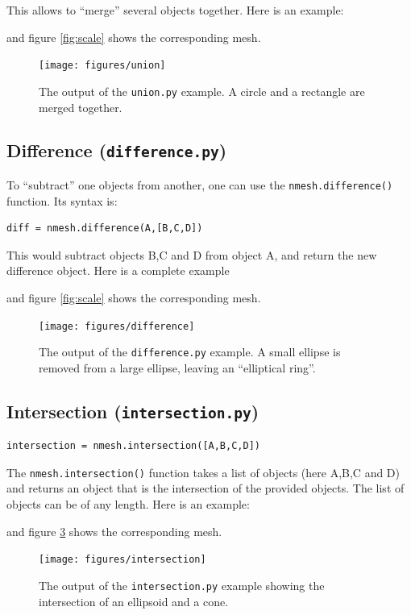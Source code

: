 \documentclass[10pt,a4paper]{book}
\newcommand{\py}[1]{\texttt{\color{blue}#1}}
\begin{document}
This allows to ``merge'' several objects together. Here is an example:

and figure \ref{fig:scale} shows the corresponding mesh.
\begin{figure}[tbhp]
\centerline{\texttt{[image: figures/union]}}
\caption{\label{fig:union} The output of the \py{union.py} example. A circle and a rectangle are merged together.}
\end{figure}


\subsection{Difference (\texttt{difference.py})}
To ``subtract'' one objects from another, one can use the \py{nmesh.difference()} function. Its syntax is:
\begin{lstlisting}
diff = nmesh.difference(A,[B,C,D])
\end{lstlisting}
This would subtract objects B,C and D from object A, and return the new difference object.
Here is a complete example

and figure \ref{fig:scale} shows the corresponding mesh.
\begin{figure}[tbhp]
\centerline{\texttt{[image: figures/difference]}}
\caption{\label{fig:difference} The output of the \py{difference.py} example. A small ellipse is removed from a large ellipse, leaving an ``elliptical ring''.}
\end{figure}

\subsection{Intersection (\texttt{intersection.py})} 
\begin{lstlisting}
intersection = nmesh.intersection([A,B,C,D])
\end{lstlisting}
The \py{nmesh.intersection()} function takes a list of objects (here A,B,C and D) and returns an object that is the intersection of the provided objects. The list of objects can be of any length. Here is an example:

and figure \ref{fig:intersection} shows the corresponding mesh.
\begin{figure}[tbhp]
\centerline{\texttt{[image: figures/intersection]}}
\caption{\label{fig:intersection} The output of the \py{intersection.py} example showing the intersection of an ellipsoid and a cone.}
\end{figure}
\end{document}
